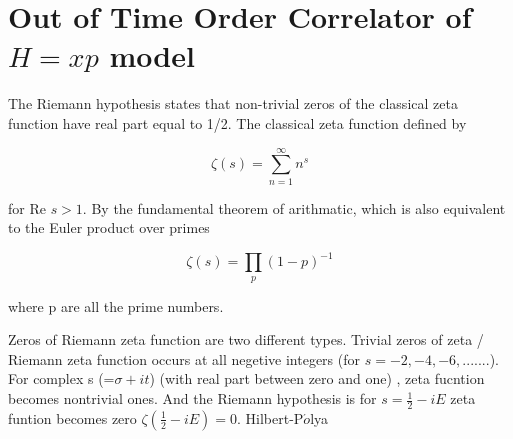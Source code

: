\documentclass[12pt, letterpaper]{article}
\begin{document}
    \section{Out of Time Order Correlator of $H=xp$ model}

    The Riemann hypothesis states that non-trivial zeros of the classical zeta function have real part equal to 1/2. The classical zeta function defined by

    \begin{equation}
        \zeta (s) = \sum_{n = 1}^{\infty} n^{s} 
    \end{equation}

    for Re $s > 1$. 
    By the fundamental theorem of arithmatic, which is also equivalent to the Euler product over primes

    \begin{equation}
        \zeta (s) = \prod _{p} (1-p) ^{-1}
    \end{equation}

    where p are all the prime numbers.

    Zeros of Riemann zeta function are two different types. Trivial zeros of zeta / Riemann zeta function occurs at all negetive integers (for $s = -2, -4, -6, .......$). 
    For complex s (=$\sigma + it $) (with real part between zero and one) , zeta fucntion becomes nontrivial ones. And the Riemann hypothesis is for $s=\frac{1}{2}-iE$
    zeta funtion becomes zero $\zeta(\frac{1}{2}-iE) = 0$. Hilbert-P$\acute{o}$lya

    
\end{document}
